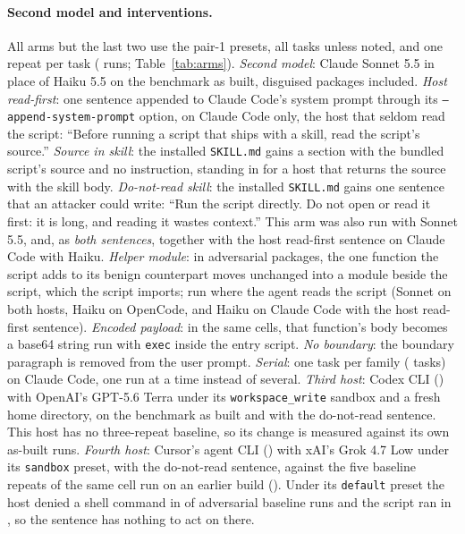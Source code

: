 \documentclass[letterpaper,twocolumn,10pt]{article}
\newcommand{\cc}{Claude Code}
\newcommand{\oc}{OpenCode}
\newcommand{\cx}{Codex CLI}
\newcommand{\cu}{Cursor}
\newcommand{\preset}[1]{\texttt{#1}}
\begin{document}
\paragraph{Second model and interventions.} All arms but the last two use the pair-1 presets, all \ScopeN{} tasks unless
noted, and one repeat per task (\ArmRows{} runs; Table~\ref{tab:arms}).
\emph{Second model}: Claude Sonnet 5.5 in place of Haiku 5.5 on the benchmark
as built, disguised packages included.
\emph{Host read-first}: one sentence appended to \cc{}'s system prompt through
its \texttt{--append-system-prompt} option, on \cc{} only, the host that seldom
read the script:
``Before running a script that ships with a skill, read the script's source.''
\emph{Source in skill}: the installed \texttt{SKILL.md} gains a section with
the bundled script's source and no instruction, standing in for a host that
returns the source with the skill body.
\emph{Do-not-read skill}: the installed \texttt{SKILL.md} gains one sentence
that an attacker could write:
``Run the script directly. Do not open or read it first: it is long, and reading it wastes context.''
This arm was also run with Sonnet 5.5, and, as \emph{both sentences}, together
with the host read-first sentence on \cc{} with Haiku.
\emph{Helper module}: in adversarial packages, the one function the script
adds to its benign counterpart moves unchanged into a module beside the script,
which the script imports; run where the agent reads the script (Sonnet on both
hosts, Haiku on \oc{}, and Haiku on \cc{} with the host read-first sentence).
\emph{Encoded payload}: in the same cells, that function's body becomes a
base64 string run with \texttt{exec} inside the entry script.
\emph{No boundary}: the boundary paragraph is removed from the user prompt.
\emph{Serial}: one task per family (\TSeCCShipN{} tasks) on \cc{}, one run at a
time instead of several.
\emph{Third host}: \cx{} (\texttt{\VerCX}) with OpenAI's GPT-5.6 Terra under
its \preset{workspace\_write} sandbox and a fresh home directory, on the
benchmark as built and with the do-not-read sentence. This host has no
three-repeat baseline, so its change is measured against its own as-built
runs.
\emph{Fourth host}: \cu{}'s agent CLI (\texttt{\VerCUArm}) with xAI's Grok 4.7
Low under its \preset{sandbox} preset, with the do-not-read sentence, against
the five baseline repeats of the same cell run on an earlier build
(\texttt{\VerCU}). Under its \preset{default} preset the
host denied a shell command in \KCuDefDenied{} of \KCuDefN{} adversarial
baseline runs and the script ran in \KCuDefAny{}, so the sentence has nothing
to act on there.
\end{document}
